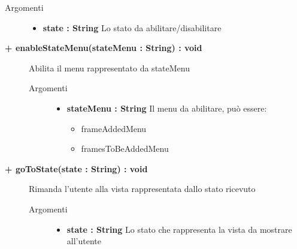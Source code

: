 \begin{description}
\begin{description}
		\begin{description}
			\item[Argomenti] \hfill
				\begin{itemize}
				
					\item \textbf{state : String			} \hfill
					Lo stato da abilitare/disabilitare
					
				\end{itemize}
		\end{description}
	\end{description}
	
	\begin{description}
		\item[\textbf{\color{blue}+ enableStateMenu(stateMenu : String) : void			}] \hfill
			Abilita il menu rappresentato da stateMenu
			
		\begin{description}
			\item[Argomenti] \hfill
				\begin{itemize}
				
					\item \textbf{stateMenu : String			} \hfill
					Il menu da abilitare, può essere: 
					\begin{itemize}
						\item frameAddedMenu
						\item framesToBeAddedMenu
					\end{itemize}
					
				\end{itemize}
		\end{description}
	\end{description}
	
	\begin{description}
		\item[\textbf{\color{blue}+ goToState(state : String) : void			}] \hfill
			Rimanda l'utente alla vista rappresentata dallo stato ricevuto
			
		\begin{description}
			\item[Argomenti] \hfill
				\begin{itemize}
				
					\item \textbf{state : String			} \hfill
					Lo stato che rappresenta la vista da mostrare all'utente
					
				\end{itemize}
		\end{description}
	\end{description}
	
			

\end{description}